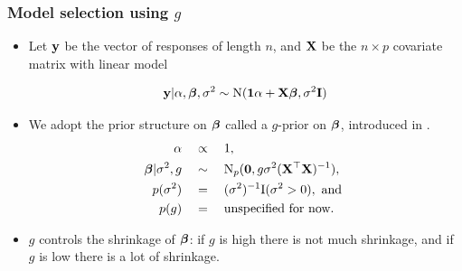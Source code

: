 \documentclass[notes=only]{beamer}
\begin{document}
 

\begin{frame}
	\frametitle{Model selection using $g$}
	\begin{itemize}
		\item 	 Let ${\bf y}$ be the vector of responses of length $n$, and ${\bf X}$ be the $n \times p$ covariate matrix with linear model
		
			\begin{align*}
	{\bf y} | \alpha, {\boldsymbol \beta}, \sigma^2 \sim \text{N}({\bf 1} \alpha + {\bf X} {\boldsymbol \beta}, \sigma^2 {\bf I}) 
	\end{align*}	
		
		\item We adopt the prior structure on ${\boldsymbol \beta}$ called a $g$-prior on ${\boldsymbol \beta}$, introduced in
		\cite{Zellner1986}.
		\begin{align*}
			\alpha \quad & \propto \quad 1, \\
			{\boldsymbol \beta} | \sigma^2, g \quad & \sim \quad \text{N}_p({\bf 0}, g \sigma^2 ({\bf X}^\top {\bf X})^{-1}),                     \\
			p(\sigma^2)          \quad & = \quad (\sigma^2)^{-1} \text{I}(\sigma^2 > 0), \text{ and }                    \\
			p(g)                 \quad & = \quad \text{unspecified for now}.
		\end{align*}
		\item $g$ controls the shrinkage of ${\boldsymbol \beta}$: if $g$ is high there is not much shrinkage,
					and if $g$ is low there is a lot of shrinkage.
	\end{itemize}
\end{frame}

\end{document}
